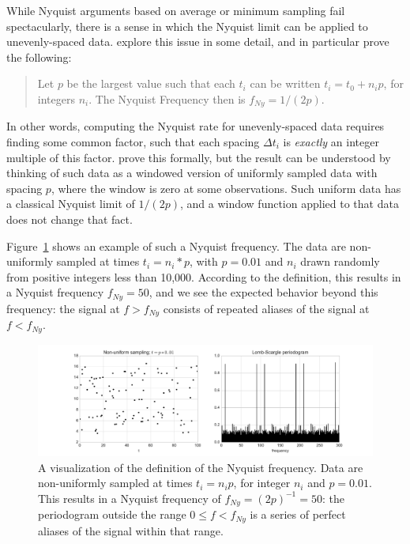 \documentclass[preprint]{aastex}
\newcommand{\Fig}[1]{Figure~\ref{fig:#1}}
\newcommand{\figlabel}[1]{\label{fig:#1}}
\begin{document}
While Nyquist arguments based on average or minimum sampling fail spectacularly,
there is a sense in which the Nyquist limit can be applied to unevenly-spaced
data. \citet{Eyer99} explore this issue in some detail, and in particular
prove the following:
\begin{quote}
Let $p$ be the largest value such that each $t_i$ can be written $t_i = t_0 + n_i p$, for integers $n_i$. The Nyquist Frequency then is $f_{Ny} = 1 / (2p)$.
\end{quote}
In other words, computing the Nyquist rate for unevenly-spaced data requires
finding some common factor, such that each spacing $\Delta t_i$ is {\it exactly}
an integer multiple of this factor.
\citet{Eyer99} prove this formally, but the result can be understood
by thinking of such data as a windowed version of uniformly sampled
data with spacing $p$, where the window is zero at some observations.
Such uniform data has a classical Nyquist limit of $1/(2p)$, and a window
function applied to that data does not change that fact.

\Fig{nyquist-eyer99} shows an example of such a Nyquist frequency.
The data are non-uniformly sampled at times $t_i = n_i * p$, with $p=0.01$
and $n_i$ drawn randomly from positive integers less than 10,000.
According to the \citet{Eyer99} definition,
this results in a Nyquist frequency $f_{Ny} = 50$, and we see the expected
behavior beyond this frequency: the signal at $f > f_{Ny}$ consists of repeated
aliases of the signal at $f < f_{Ny}$.

\begin{figure}[ht]
  \centering
  \includegraphics[width=\textwidth]{fig13_nyquist_eyer99}
  \caption{A visualization of the \citep{Eyer99} definition of the Nyquist
    frequency. Data are non-uniformly sampled at times $t_i = n_i p$, for
    integer $n_i$ and $p=0.01$.
    This results in a Nyquist frequency of $f_{Ny}= (2p)^{-1} = 50$:
    the periodogram outside the range $0 \le f < f_{Ny}$ is a series of
    perfect aliases of the signal within that range.
    \figlabel{nyquist-eyer99}}
\end{figure}
\end{document}
